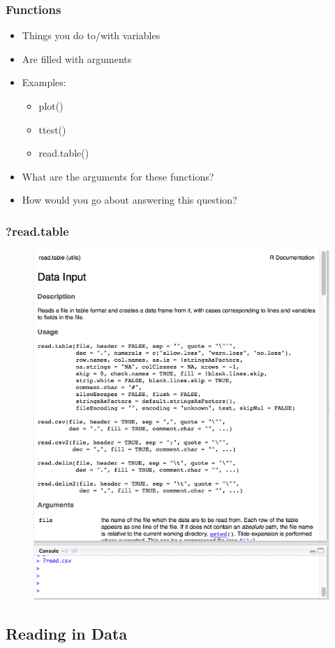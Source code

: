 \documentclass[14pt]{beamer}
\begin{document}
\begin{frame}
\frametitle{Functions}
\begin{itemize}
	\item<+-> Things you do to/with variables
	\item<+-> Are filled with arguments
	\item<+-> Examples:
	\begin{itemize}
		\item<+-> plot()
		\item<+-> ttest()
		\item<+-> read.table()
	\end{itemize}
	\item<+-> What are the arguments for these functions?
	\item<+-> How would you go about answering this question?
\end{itemize}
\end{frame}

\begin{frame}
\frametitle{?read.table}
\begin{figure}
\includegraphics[width=0.52\linewidth]{images_20170907_readcsv.png}
\end{figure}
\end{frame}

\subsection{Reading in Data}
\end{document}
